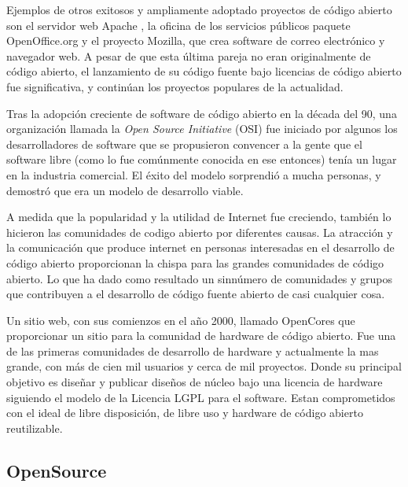 Ejemplos de otros exitosos y ampliamente adoptado proyectos de código abierto son el servidor web Apache , la oficina de los servicios públicos paquete OpenOffice.org y el proyecto Mozilla, que crea software de correo electrónico y navegador web. A pesar de que esta última pareja no eran originalmente de código abierto, el lanzamiento de su código fuente bajo licencias de código abierto fue significativa, y continúan los proyectos populares de la actualidad.

Tras la adopción creciente de software de código abierto en la década del 90, una organización llamada la \textit{Open Source Initiative} (OSI) fue iniciado por algunos los desarrolladores de software que se propusieron convencer a la gente que el software libre (como lo fue comúnmente conocida en ese entonces) tenía un lugar en la industria comercial. El éxito del modelo sorprendió a mucha personas, y demostró que era un modelo de desarrollo viable.  

A medida que la popularidad y la utilidad de Internet fue creciendo, también lo hicieron las  comunidades de codigo abierto por diferentes causas. La atracción y la comunicación que produce internet en personas interesadas en el desarrollo de código abierto proporcionan la chispa para las grandes comunidades de código abierto. Lo que ha dado como resultado un sinnúmero de comunidades y  grupos que contribuyen a el desarrollo de código fuente abierto de casi cualquier cosa.

Un sitio web, con sus comienzos en el año 2000, llamado OpenCores que proporcionar un sitio para la comunidad de hardware de código abierto. Fue una de las primeras comunidades de desarrollo de hardware y actualmente la mas grande, con más de cien mil usuarios y cerca de mil proyectos. Donde su principal objetivo es diseñar y publicar diseños de núcleo bajo una licencia de hardware siguiendo el modelo de la Licencia LGPL para el software. Estan comprometidos con el ideal de libre disposición, de libre uso y hardware de código abierto reutilizable.\cite{Etiqueta10}

\subsection{OpenSource}

